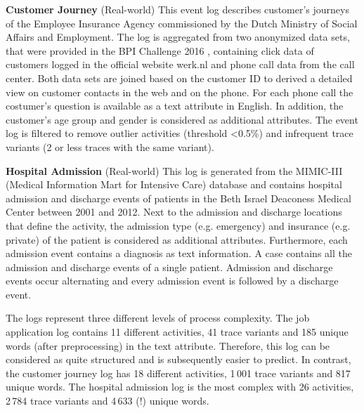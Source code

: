 \textbf{Customer Journey} (Real-world) This event log describes customer's journeys of the Employee Insurance Agency commissioned by the Dutch Ministry of Social Affairs and Employment.
The log is aggregated from two anonymized data sets, that were provided in the BPI Challenge 2016 \cite{bpichallenge2016}, containing click data of customers logged in the official website werk.nl and phone call data from the call center.
Both data sets are joined based on the customer ID to derived a detailed view on customer contacts in the web and on the phone.
For each phone call the costumer's question is available as a text attribute in English.
In addition, the customer's age group and gender is considered as additional attributes.
The event log is filtered to remove outlier activities (threshold <0.5\%) and infrequent trace variants (2 or less traces with the same variant).
 
\textbf{Hospital Admission} (Real-world) This log is generated from the MIMIC-III (Medical Information Mart for Intensive Care) database \cite{johnson2016mimic} and contains hospital admission and discharge events of patients in the Beth Israel Deaconess Medical Center between 2001 and 2012.
Next to the admission and discharge locations that define the activity, the admission type (e.g. emergency) and insurance (e.g. private) of the patient is considered as additional attributes.
Furthermore, each admission event contains a diagnosis as text information.
A case contains all the admission and discharge events of a single patient.
Admission and discharge events occur alternating and every admission event is followed by a discharge event.

The logs represent three different levels of process complexity.
The job application log contains 11 different activities, 41 trace variants and 185 unique words (after preprocessing) in the text attribute.
Therefore, this log can be considered as quite structured and is subsequently easier to predict.
In contrast, the customer journey log has 18 different activities, 1\,001 trace variants and 817 unique words.
The hospital admission log is the most complex with 26 activities, 2\,784 trace variants and 4\,633 (!) unique words.

